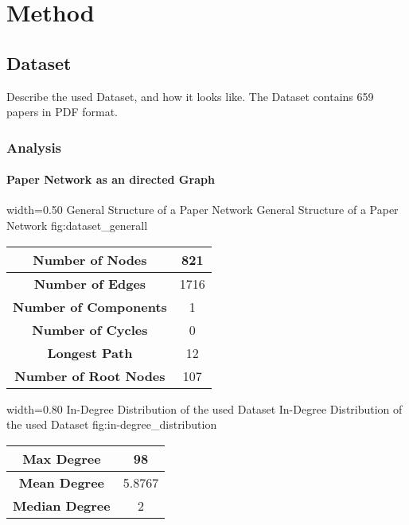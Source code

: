 \chapter{Method}
\label{cha:method}

\section{Dataset}
\label{sec:dataset}

Describe the used Dataset, and how it looks like.
The Dataset contains 659 papers in PDF format.

\subsection{Analysis}
\label{sec:analysis}

\subsubsection{Paper Network as an directed Graph}
\label{sec:undirected_graph}

      {width=0.50\textwidth}
      {General Structure of a Paper Network}
      {General Structure of a Paper Network}
      {fig:dataset_generall}

\begin{center}
  \begin{tabular}{ | c | c | }
    \hline
    \textbf{Number of Nodes} & 821 \\ \hline
    \textbf{Number of Edges} & 1716 \\ \hline
    \textbf{Number of Components} & 1 \\ \hline
    \textbf{Number of Cycles} & 0 \\ \hline
    \textbf{Longest Path} & 12 \\ \hline
    \textbf{Number of Root Nodes} & 107 \\ \hline
  \end{tabular}
\end{center}


      {width=0.80\textwidth}
      {In-Degree Distribution of the used Dataset}
      {In-Degree Distribution of the used Dataset}
      {fig:in-degree_distribution}

    \begin{center}
      \begin{tabular}{ | c | c | }
        \hline
        \textbf{Max Degree} & 98 \\ \hline
        \textbf{Mean Degree} & 5.8767 \\ \hline
        \textbf{Median Degree} & 2 \\ \hline
      \end{tabular}
    \end{center}

